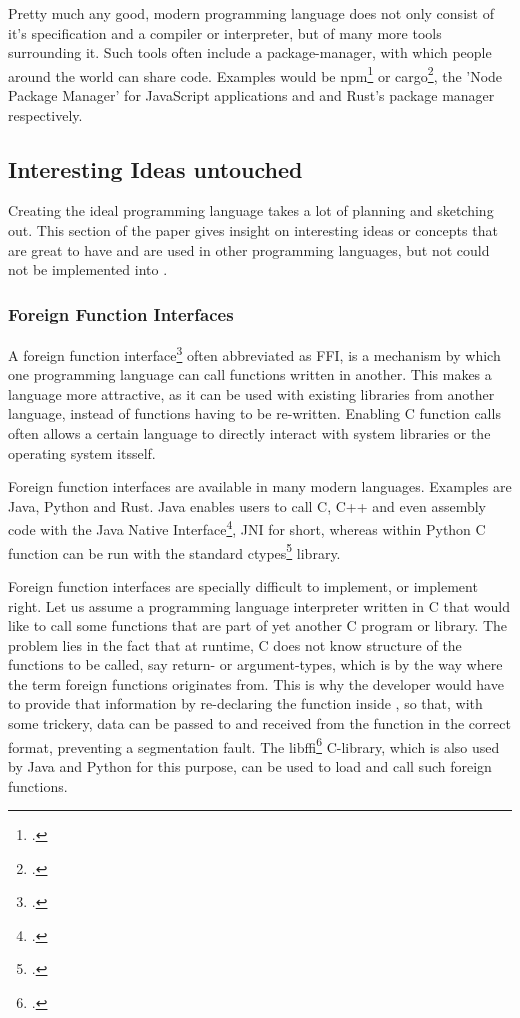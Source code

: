 \documentclass[12pt,a4paper,man]{apa7}
\begin{document}
Pretty much any good, modern programming language does not only consist
of it's specification and a compiler or interpreter, but of many more
tools surrounding it.
Such tools often include a package-manager, with which people around the world
can share code. Examples would be npm\footcite{npm} or cargo\footcite{cargo}, 
the 'Node Package Manager' for JavaScript applications and and Rust's package 
manager respectively.

\subsection{Interesting Ideas untouched}
Creating the ideal programming language takes a lot of planning and sketching
out. This section of the paper gives insight on interesting ideas or concepts
that are great to have and are used in other programming languages, but not 
could not be implemented into \name.

\subsubsection{Foreign Function Interfaces}
A foreign function interface\footcite{FFI} often abbreviated as FFI,
is a mechanism by which one programming language can call functions written 
in another. This makes a language more attractive, as it can be used with
existing libraries from another language, instead of functions having to be
re-written. Enabling C function calls often allows a certain language to
directly interact with system libraries or the operating system itsself.

Foreign function interfaces are available in many modern languages.
Examples are Java, Python and Rust.
Java enables users to call C, C++ and even assembly code with the Java Native
Interface\footcite{JNI}, JNI for short, whereas within Python C function can
be run with the standard ctypes\footcite{ctypes} library.

Foreign function interfaces are specially difficult to implement, or implement
right. Let us assume a programming language interpreter \name written in C that
would like to call some functions that are part of yet another C program or
library. The problem lies in the fact that at runtime, C does not know
structure of the functions to be called, say return- or argument-types, which
is by the way where the term foreign functions originates from. This is why the
\name developer would have to provide that information by re-declaring the
function inside \name, so that, with some trickery, data can be passed to and
received from the function in the correct format, preventing a segmentation
fault. The libffi\footcite{libffi} C-library, which is also used by Java and
Python for this purpose, can be used to load and call such foreign functions.
\end{document}
